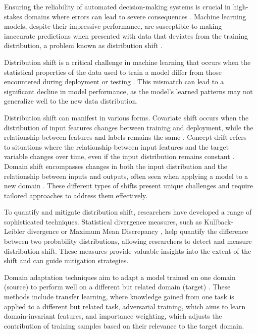 Ensuring the reliability of automated decision-making systems is crucial in high-stakes domains where errors can lead to severe consequences \cite{amodei2016concrete}. Machine learning models, despite their impressive performance, are susceptible to making inaccurate predictions when presented with data that deviates from the training distribution, a problem known as distribution shift \cite{hendrycks2021many, quinonero2009dataset}.

Distribution shift is a critical challenge in machine learning that occurs when the statistical properties of the data used to train a model differ from those encountered during deployment or testing \cite{quinonero2009dataset, hendrycks2019benchmarking}. This mismatch can lead to a significant decline in model performance, as the model's learned patterns may not generalize well to the new data distribution.

Distribution shift can manifest in various forms. Covariate shift occurs when the distribution of input features changes between training and deployment, while the relationship between features and labels remains the same \cite{shimodaira2000improving}. Concept drift refers to situations where the relationship between input features and the target variable changes over time, even if the input distribution remains constant \cite{gama2014survey}. Domain shift encompasses changes in both the input distribution and the relationship between inputs and outputs, often seen when applying a model to a new domain \cite{patel2015visual}. These different types of shifts present unique challenges and require tailored approaches to address them effectively.

To quantify and mitigate distribution shift, researchers have developed a range of sophisticated techniques. Statistical divergence measures, such as Kullback-Leibler divergence \cite{kullback1951information} or Maximum Mean Discrepancy \cite{gretton2012kernel}, help quantify the difference between two probability distributions, allowing researchers to detect and measure distribution shift. These measures provide valuable insights into the extent of the shift and can guide mitigation strategies.

Domain adaptation techniques aim to adapt a model trained on one domain (source) to perform well on a different but related domain (target) \cite{wang2018deep, sugiyama2007covariate, pan2009survey, ganin2016domain}. These methods include transfer learning, where knowledge gained from one task is applied to a different but related task, adversarial training, which aims to learn domain-invariant features, and importance weighting, which adjusts the contribution of training samples based on their relevance to the target domain.

